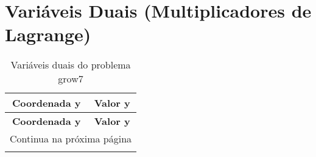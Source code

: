 \documentclass[12pt]{article}
\begin{document}
\section{Variáveis Duais (Multiplicadores de Lagrange)}

\begin{longtable}{@{}cc@{}}
\caption{Variáveis duais do problema grow7} \\
\toprule
\textbf{Coordenada y} & \textbf{Valor y} \\
\midrule
\endfirsthead

\toprule
\textbf{Coordenada y} & \textbf{Valor y} \\
\midrule
\endhead

\midrule \multicolumn{2}{r}{{Continua na próxima página}} \\ \midrule
\endfoot


\end{longtable}
\end{document}
